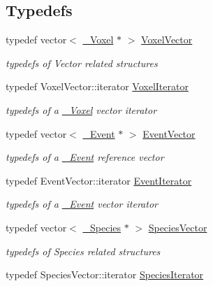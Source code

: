 \subsection*{Typedefs}
\begin{DoxyCompactItemize}
\item 
typedef vector$<$ \hyperlink{classnw_1_1___voxel}{\+\_\+\+Voxel} $\ast$ $>$ \hyperlink{namespacenw_ad7146b8b5a9de9be416847f41135722c}{Voxel\+Vector}
\begin{DoxyCompactList}\small\item\em typedefs of Vector related structures \end{DoxyCompactList}\item 
typedef Voxel\+Vector\+::iterator \hyperlink{namespacenw_a79f35b5a82b764c7144ecf3074e926c0}{Voxel\+Iterator}
\begin{DoxyCompactList}\small\item\em typedefs of a \hyperlink{classnw_1_1___voxel}{\+\_\+\+Voxel} vector iterator \end{DoxyCompactList}\item 
typedef vector$<$ \hyperlink{classnw_1_1___event}{\+\_\+\+Event} $\ast$ $>$ \hyperlink{namespacenw_a0d9ea27d7802637354c7892806eac1fc}{Event\+Vector}
\begin{DoxyCompactList}\small\item\em typedefs of a \hyperlink{classnw_1_1___event}{\+\_\+\+Event} reference vector \end{DoxyCompactList}\item 
typedef Event\+Vector\+::iterator \hyperlink{namespacenw_a543a4f72e609ca94582c1c7c10303e0b}{Event\+Iterator}
\begin{DoxyCompactList}\small\item\em typedefs of a \hyperlink{classnw_1_1___event}{\+\_\+\+Event} vector iterator \end{DoxyCompactList}\item 
typedef vector$<$ \hyperlink{classnw_1_1___species}{\+\_\+\+Species} $\ast$ $>$ \hyperlink{namespacenw_a68aa8285591d78ebfc793c531bd43a23}{Species\+Vector}
\begin{DoxyCompactList}\small\item\em typedefs of Species related structures \end{DoxyCompactList}\item 
typedef Species\+Vector\+::iterator \hyperlink{namespacenw_a28941aaaa0562445c168a620b63547d2}{Species\+Iterator}
\end{DoxyCompactItemize}

